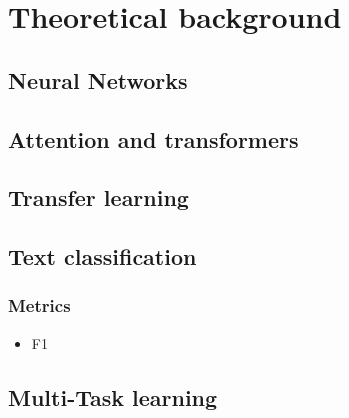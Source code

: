 \chapter{Theoretical background}

\section{Neural Networks }
\section{Attention and transformers}\label{att_transformers}
\section{Transfer learning}
\section{Text classification}
\subsection{Metrics}
\begin{itemize}
    \item F1 \label{f1}
\end{itemize}
\section{Multi-Task learning}
